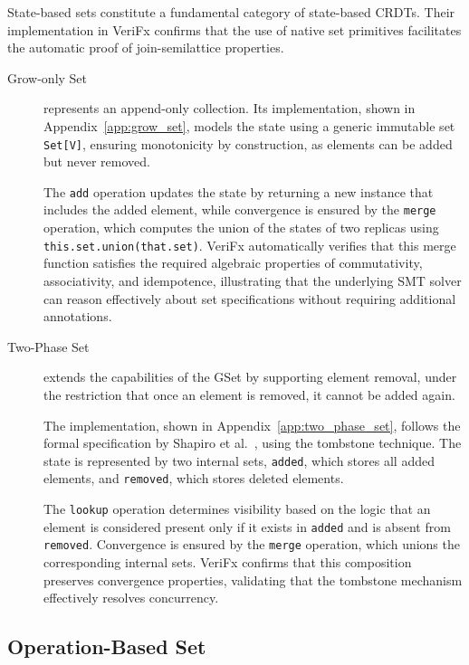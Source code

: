 State-based sets constitute a fundamental category of state-based CRDTs. Their implementation in VeriFx confirms that the use of native set primitives facilitates the automatic proof of join-semilattice properties.

\begin{description}
  \item[Grow-only Set] represents an append-only collection. Its implementation, shown in Appendix~\ref{app:grow_set}, models the state using a generic immutable set \texttt{Set[V]}, ensuring monotonicity by construction, as elements can be added but never removed.

        The \texttt{add} operation updates the state by returning a new instance that includes the added element, while convergence is ensured by the \texttt{merge} operation, which computes the union of the states of two replicas using \texttt{this.set.union(that.set)}. VeriFx automatically verifies that this merge function satisfies the required algebraic properties of commutativity, associativity, and idempotence, illustrating that the underlying SMT solver can reason effectively about set specifications without requiring additional annotations.
  \item[Two-Phase Set] extends the capabilities of the GSet by supporting element removal, under the restriction that once an element is removed, it cannot be added again.

        The implementation, shown in Appendix~\ref{app:two_phase_set}, follows the formal specification by Shapiro et al.~\cite{shapiro2011comprehensive}, using the tombstone technique. The state is represented by two internal sets, \texttt{added}, which stores all added elements, and \texttt{removed}, which stores deleted elements.

        The \texttt{lookup} operation determines visibility based on the logic that an element is considered present only if it exists in \texttt{added} and is absent from \texttt{removed}. Convergence is ensured by the \texttt{merge} operation, which unions the corresponding internal sets. VeriFx confirms that this composition preserves convergence properties, validating that the tombstone mechanism effectively resolves concurrency.
\end{description}

\subsection{Operation-Based Set}
\label{sub:operation_set}

